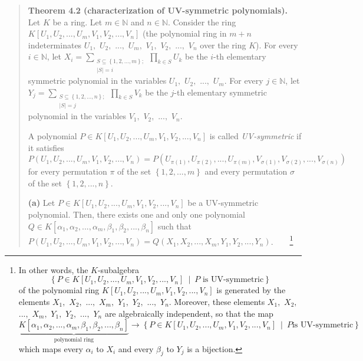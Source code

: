 \documentclass[numbers=enddot,12pt,final,onecolumn,notitlepage]{scrartcl}%
\begin{document}
\begin{quote}
\textbf{Theorem 4.2 (characterization of UV-symmetric polynomials).} Let $K$
be a ring. Let $m\in\mathbb{N}$ and $n\in\mathbb{N}$. Consider the ring
$K\left[  U_{1},U_{2},...,U_{m},V_{1},V_{2},...,V_{n}\right]  $ (the
polynomial ring in $m+n$ indeterminates $U_{1},$ $U_{2},$ $...,$ $U_{m},$
$V_{1},$ $V_{2},$ $...,$ $V_{n}$ over the ring $K$). For every $i\in
\mathbb{N}$, let $X_{i}=\sum\limits_{\substack{S\subseteq\left\{
1,2,...,m\right\}  ;\\\left\vert S\right\vert =i}}\prod\limits_{k\in S}U_{k}$
be the $i$-th elementary symmetric polynomial in the variables $U_{1},$
$U_{2},$ $...,$ $U_{m}$. For every $j\in\mathbb{N}$, let $Y_{j}=\sum
\limits_{\substack{S\subseteq\left\{  1,2,...,n\right\}  ;\\\left\vert
S\right\vert =j}}\prod\limits_{k\in S}V_{k}$ be the $j$-th elementary
symmetric polynomial in the variables $V_{1},$ $V_{2},$ $...,$ $V_{n}$.

A polynomial $P\in K\left[  U_{1},U_{2},...,U_{m},V_{1},V_{2},...,V_{n}%
\right]  $ is called \textit{UV-symmetric} if it satisfies%
\[
P\left(  U_{1},U_{2},...,U_{m},V_{1},V_{2},...,V_{n}\right)  =P\left(
U_{\pi\left(  1\right)  },U_{\pi\left(  2\right)  },...,U_{\pi\left(
m\right)  },V_{\sigma\left(  1\right)  },V_{\sigma\left(  2\right)
},...,V_{\sigma\left(  n\right)  }\right)
\]
for every permutation $\pi$ of the set $\left\{  1,2,...,m\right\}  $ and
every permutation $\sigma$ of the set $\left\{  1,2,...,n\right\}  $.

\textbf{(a)} Let $P\in K\left[  U_{1},U_{2},...,U_{m},V_{1},V_{2}%
,...,V_{n}\right]  $ be a UV-symmetric polynomial. Then, there exists one and
only one polynomial $Q\in K\left[  \alpha_{1},\alpha_{2},...,\alpha_{m}%
,\beta_{1},\beta_{2},...,\beta_{n}\right]  $ such that $P\left(  U_{1}%
,U_{2},...,U_{m},V_{1},V_{2},...,V_{n}\right)  =Q\left(  X_{1},X_{2}%
,...,X_{m},Y_{1},Y_{2},...,Y_{n}\right)  $.\ \ \ \ \footnote{In other words,
the $K$-subalgebra%
\[
\left\{  P\in K\left[  U_{1},U_{2},...,U_{m},V_{1},V_{2},...,V_{n}\right]
\ \mid\ P\text{ is UV-symmetric}\right\}
\]
of the polynomial ring $K\left[  U_{1},U_{2},...,U_{m},V_{1},V_{2}%
,...,V_{n}\right]  $ is generated by the elements $X_{1},$ $X_{2},$ $...,$
$X_{m},$ $Y_{1},$ $Y_{2},$ $...,$ $Y_{n}$. Moreover, these elements $X_{1},$
$X_{2},$ $...,$ $X_{m},$ $Y_{1},$ $Y_{2},$ $...,$ $Y_{n}$ are algebraically
independent, so that the map%
\[
\underbrace{K\left[  \alpha_{1},\alpha_{2},...,\alpha_{m},\beta_{1},\beta
_{2},...,\beta_{n}\right]  }_{\text{polynomial ring}}\rightarrow\left\{  P\in
K\left[  U_{1},U_{2},...,U_{m},V_{1},V_{2},...,V_{n}\right]  \ \mid\ P\text{
is UV-symmetric}\right\}
\]
which maps every $\alpha_{i}$ to $X_{i}$ and every $\beta_{j}$ to $Y_{j}$ is a
bijection.}


\end{quote}
\end{document}
